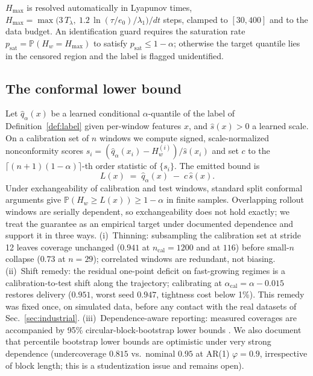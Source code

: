 \documentclass[aps,pre,twocolumn,superscriptaddress,nofootinbib,longbibliography]{revtex4-2}
\newcommand{\Hw}{H_w}
\newcommand{\Hmax}{H_{\max}}
\newcommand{\Tlyap}{T_\lambda}
\begin{document}
$\Hmax$ is resolved automatically in Lyapunov times,
$\Hmax = \max\!\big(3\,\Tlyap,\ 1.2\,\ln(\tau/e_0)/\lambda_1\big)/dt$
steps, clamped to $[30, 400]$ and to the data budget. An identification guard requires
the saturation rate $p_{\mathrm{sat}} = \mathbb{P}(\Hw = \Hmax)$ to
satisfy $p_{\mathrm{sat}} \le 1-\alpha$; otherwise the target quantile
lies in the censored region and the label is flagged unidentified.

\subsection{The conformal lower bound}
\label{sec:conformal}

Let $\hat q_\alpha(x)$ be a learned conditional $\alpha$-quantile of the
label of Definition~\ref{def:label} given per-window features $x$, and
$\hat s(x) > 0$ a learned scale. On a calibration set of $n$ windows we
compute signed, scale-normalized nonconformity scores
$s_i = (\hat q_\alpha(x_i) - \Hw^{(i)})/\hat s(x_i)$ and set $c$ to the
$\lceil (n+1)(1-\alpha) \rceil$-th order statistic of $\{s_i\}$. The
emitted bound is
\begin{equation}
L(x) \;=\; \hat q_\alpha(x) \;-\; c\,\hat s(x).
\label{eq:bound}
\end{equation}
Under exchangeability of calibration and test windows, standard split
conformal arguments give $\mathbb{P}(\Hw \ge L(x)) \ge 1-\alpha$ in finite
samples. Overlapping rollout windows are serially dependent, so
exchangeability does not hold exactly; we treat the guarantee as an
empirical target under documented dependence and support it in three
ways. (i)~Thinning: subsampling the calibration set at stride 12 leaves
coverage unchanged ($0.941$ at $n_{\mathrm{cal}} = 1200$ and at $116$)
before small-$n$ collapse ($0.73$ at $n = 29$); correlated windows are
redundant, not biasing. (ii)~Shift remedy: the residual one-point deficit
on fast-growing regimes is a calibration-to-test shift along the
trajectory; calibrating at $\alpha_{\mathrm{cal}} = \alpha - 0.015$
restores delivery ($0.951$, worst seed $0.947$, tightness cost below
1\%). This remedy was fixed once, on simulated data, before any contact
with the real datasets of Sec.~\ref{sec:industrial}.
(iii)~Dependence-aware reporting: measured coverages are accompanied by
95\% circular-block-bootstrap lower bounds \citep{politis1992circular}.
We also document that percentile bootstrap lower bounds are optimistic
under very strong dependence (undercoverage $0.815$ vs.\ nominal $0.95$
at AR(1) $\varphi = 0.9$, irrespective of block length; this is a
studentization issue and remains open).
\end{document}
